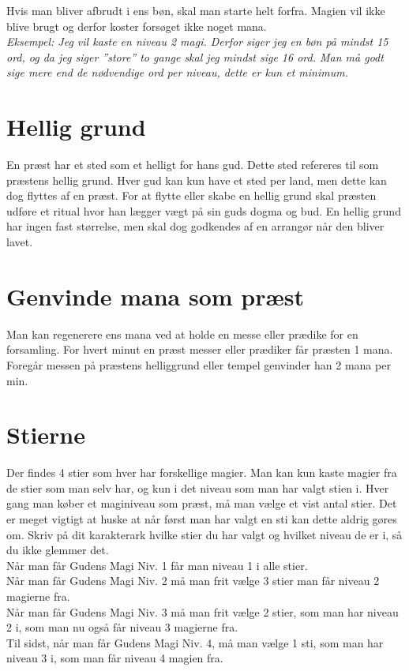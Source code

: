 Hvis man bliver afbrudt i ens bøn, skal man starte helt forfra. Magien vil ikke blive brugt og derfor koster forsøget ikke noget mana.\\
\textit{Eksempel: Jeg vil kaste en niveau 2 magi. Derfor siger jeg en bøn på mindst 15 ord, og da jeg siger ”store” to gange skal jeg mindst sige 16 ord. Man må godt sige mere end de nødvendige ord per niveau, dette er kun et minimum.}

\section{Hellig grund}
En præst har et sted som et helligt for hans gud. Dette sted refereres til som præstens hellig grund. Hver gud kan kun have et sted per land, men dette kan dog flyttes af en præst. For at flytte eller skabe en hellig grund skal præsten udføre et ritual hvor han lægger vægt på sin guds dogma og bud. En hellig grund har ingen fast størrelse, men skal dog godkendes af en arrangør når den bliver lavet.

\section{Genvinde mana som præst}
Man kan regenerere ens mana ved at holde en messe eller prædike for en forsamling. For hvert minut en præst messer eller prædiker får præsten 1 mana. Foregår messen på præstens helliggrund eller tempel genvinder han 2 mana per min.

\section{Stierne}
Der findes 4 stier som hver har forskellige magier. Man kan kun kaste magier fra de stier som man selv har, og kun i det niveau som man har valgt stien i. Hver gang man køber et maginiveau som præst, må man vælge et vist antal stier. Det er meget vigtigt at huske at når først man har valgt en sti kan dette aldrig gøres om. Skriv på dit karakterark hvilke stier du har valgt og hvilket niveau de er i, så du ikke glemmer det.\\
Når man får Gudens Magi Niv. 1 får man niveau 1 i alle stier. \\
Når man får Gudens Magi Niv. 2 må man frit vælge 3 stier man får niveau 2 magierne fra.\\ 
Når man får Gudens Magi Niv. 3 må man frit vælge 2 stier, som man har niveau 2 i, som man nu også får niveau 3 magierne fra.\\ 
Til sidst, når man får Gudens Magi Niv. 4, må man vælge 1 sti, som man har niveau 3 i, som man får niveau 4 magien fra.







